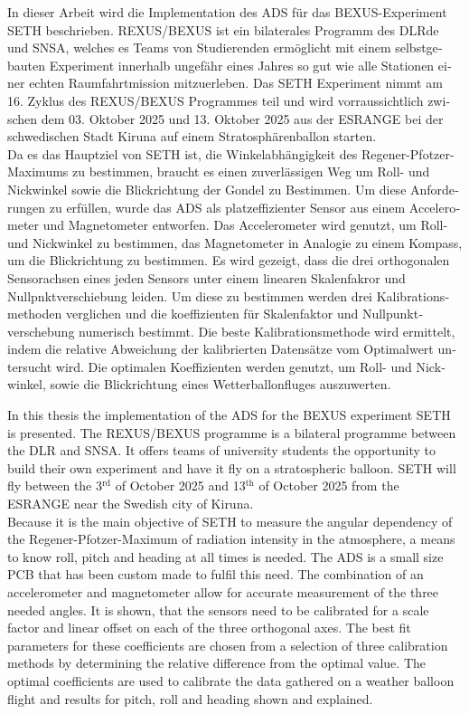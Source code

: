 \begin{otherlanguage}{ngerman}
In dieser Arbeit wird die Implementation des \acf{ADS} für das \ac{BEXUS}-Experiment \ac{SETH} beschrieben. \acs{REXUS}/\acs{BEXUS} ist ein bilaterales Programm des \acf{DLRde} und \acf{SNSA}, welches es Teams von Studierenden ermöglicht mit einem selbstgebauten Experiment innerhalb ungefähr eines Jahres so gut wie alle Stationen einer echten Raumfahrtmission mitzuerleben. Das \ac{SETH} Experiment nimmt am 16. Zyklus des \acs{REXUS}/\acs{BEXUS} Programmes teil und wird vorraussichtlich zwischen dem 03. Oktober 2025 und 13. Oktober 2025 aus der \ac{ESRANGE} bei der schwedischen Stadt Kiruna auf einem Stratosphärenballon starten.\\
Da es das Hauptziel von \ac{SETH} ist, die Winkelabhängigkeit des Regener-Pfotzer-Maximums zu bestimmen, braucht es einen zuverlässigen Weg um Roll- und Nickwinkel sowie die Blickrichtung der Gondel zu Bestimmen. Um diese Anforderungen zu erfüllen, wurde das \ac{ADS} als platzeffizienter Sensor aus einem Accelerometer und Magnetometer entworfen. Das Accelerometer wird genutzt, um Roll- und Nickwinkel zu bestimmen, das Magnetometer in Analogie zu einem Kompass, um die Blickrichtung zu bestimmen. Es wird gezeigt, dass die drei orthogonalen Sensorachsen eines jeden Sensors unter einem linearen Skalenfakror und Nullpnktverschiebung leiden. Um diese zu bestimmen werden drei Kalibrationsmethoden verglichen und die koeffizienten für Skalenfaktor und Nullpunktverschebung numerisch bestimmt. Die beste Kalibrationsmethode wird ermittelt, indem die relative Abweichung der kalibrierten Datensätze vom Optimalwert untersucht wird. Die optimalen Koeffizienten werden genutzt, um Roll- und Nickwinkel, sowie die Blickrichtung eines Wetterballonfluges auszuwerten.
\end{otherlanguage}

In this thesis the implementation of the \acf{ADS} for the \acf{BEXUS} experiment \acf{SETH} is presented. The \acs{REXUS}/\acs{BEXUS} programme is a bilateral programme between the \acf{DLR} and \acf{SNSA}. It offers teams of university students the opportunity to build their own experiment and have it fly on a stratospheric balloon. \ac{SETH} will fly between the 3$^\mathrm{rd}$ of October 2025 and 13$^\mathrm{th}$ of October 2025 from the \acf{ESRANGE} near the Swedish city of Kiruna.\\ Because it is the main objective of \ac{SETH} to measure the angular dependency of the Regener-Pfotzer-Maximum of radiation intensity in the atmosphere, a means to know roll, pitch and heading at all times is needed. The \ac{ADS} is a small size \acs{PCB} that has been custom made to fulfil this need. The combination of an accelerometer and magnetometer allow for accurate measurement of the three needed angles. It is shown, that the sensors need to be calibrated for a scale factor and linear offset on each of the three orthogonal axes. The best fit parameters for these coefficients are chosen from a selection of three calibration methods by determining the relative difference from the optimal value. The optimal coefficients are used to calibrate the data gathered on a weather balloon flight and results for pitch, roll and heading shown and explained.